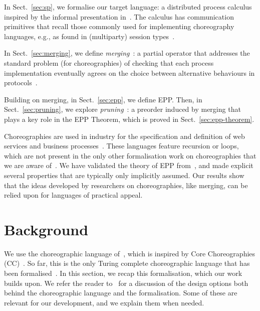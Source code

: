 \documentclass[runningheads]{llncs}
\begin{document}
In Sect.~\ref{sec:sp}, we formalise our target language: a distributed process calculus inspired by the informal presentation in~\cite{M21itc}. The calculus has communication primitives that recall those commonly used for implementing choreography languages, e.g., as found in (multiparty) session types~\cite{HYC16}.

In Sect.~\ref{sec:merging}, we define \emph{merging}~\cite{CHY12}: a partial operator that addresses the standard problem (for choreographies) of checking that each process implementation eventually agrees on the choice between alternative behaviours in protocols~\cite{BBO12,CHY12}.

Building on merging, in Sect.~\ref{sec:epp}, we define EPP. Then, in Sect.~\ref{sec:pruning}, we explore \emph{pruning}~\cite{CHY12}: a preorder induced by merging that plays a key role in the EPP Theorem, which is proved in Sect.~\ref{sec:epp-theorem}.

Choreographies are used in industry for the specification and definition of web services and business processes~\cite{bpmn,wscdl}. These languages feature recursion or loops, which are not present in the only other formalisation work on choreographies that we are aware of~\cite{GA18}. We have validated the theory of EPP from~\cite{M21itc}, and made explicit several properties that are typically only implicitly assumed. Our results show that the ideas developed by researchers on choreographies, like merging, can be relied upon for languages of practical appeal.

\section{Background}
\label{sec:background}

We use the choreographic language of~\cite{M21itc}, which is inspired by Core Choreographies (CC)~\cite{CM20}. So far, this is the only Turing complete choreographic language that has been formalised~\cite{CMP21}.
In this section, we recap this formalisation, which our work builds upon.
We refer the reader to~\cite{CMP21} for a discussion of the design options both behind the
choreographic language and the formalisation.
Some of these are relevant for our development, and we explain them when needed.
\end{document}
